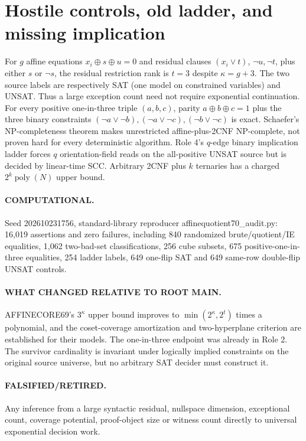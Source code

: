 \documentclass[11pt]{article}
\begin{document}
\section{Hostile controls, old ladder, and missing implication}
For $g$ affine equations $x_i\oplus s\oplus u=0$ and residual clauses $(x_i\vee t)$, $\neg u,\neg t$, plus either $s$ or $\neg s$, the residual restriction rank is $t=3$ despite $\kappa=g+3$. The two source labels are respectively SAT (one model on constrained variables) and UNSAT. Thus a large exception count need not require exponential continuation.
For every positive one-in-three triple $(a,b,c)$, parity $a\oplus b\oplus c=1$ plus the three binary constraints $(\neg a\vee\neg b),(\neg a\vee\neg c),(\neg b\vee\neg c)$ is exact. Schaefer's NP-completeness theorem makes unrestricted affine-plus-2CNF NP-complete, not proven hard for every deterministic algorithm. Role 4's $q$-edge binary implication ladder forces $q$ orientation-field reads on the all-positive UNSAT source but is decided by linear-time SCC. Arbitrary 2CNF plus $k$ ternaries has a charged $2^k\operatorname{poly}(N)$ upper bound.
\paragraph{COMPUTATIONAL.} Seed 202610231756, standard-library reproducer affinequotient70_audit.py: 16,019 assertions and zero failures, including 840 randomized brute/quotient/IE equalities, 1,062 two-bad-set classifications, 256 cube subsets, 675 positive-one-in-three equalities, 254 ladder labels, 649 one-flip SAT and 649 same-row double-flip UNSAT controls.
\paragraph{WHAT CHANGED RELATIVE TO ROOT MAIN.} AFFINECORE69's $3^\kappa$ upper bound improves to $\min(2^\kappa,2^t)$ times a polynomial, and the coset-coverage amortization and two-hyperplane criterion are established for their models. The one-in-three endpoint was already in Role 2. The survivor cardinality is invariant under logically implied constraints on the original source universe, but no arbitrary SAT decider must construct it.
\paragraph{FALSIFIED/RETIRED.} Any inference from a large syntactic residual, nullspace dimension, exceptional count, coverage potential, proof-object size or witness count directly to universal exponential decision work.
\end{document}

